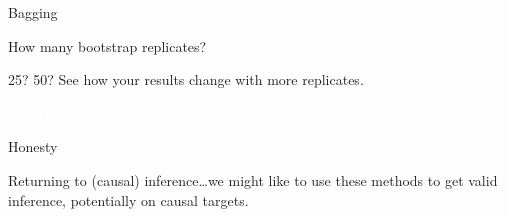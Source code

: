 \documentclass[xcolor={table}, handout]{beamer}
\begin{document}

\begin{frame}{Bagging}

\begin{wideitemize}
\item How many bootstrap replicates? \pause
\item 25? 50? \pause See how your results change with more replicates. 
\end{wideitemize}

\end{frame}



\begin{transitionframe}
\centering

\LARGE \textcolor{white}{Honesty.}

\end{transitionframe}
\begin{frame}{Honesty}

\begin{wideitemize}
\item Returning to (causal) inference\dots \pause we might like to use these methods to get valid inference, potentially on causal targets.
\end{wideitemize}

\end{frame}


\end{document}
